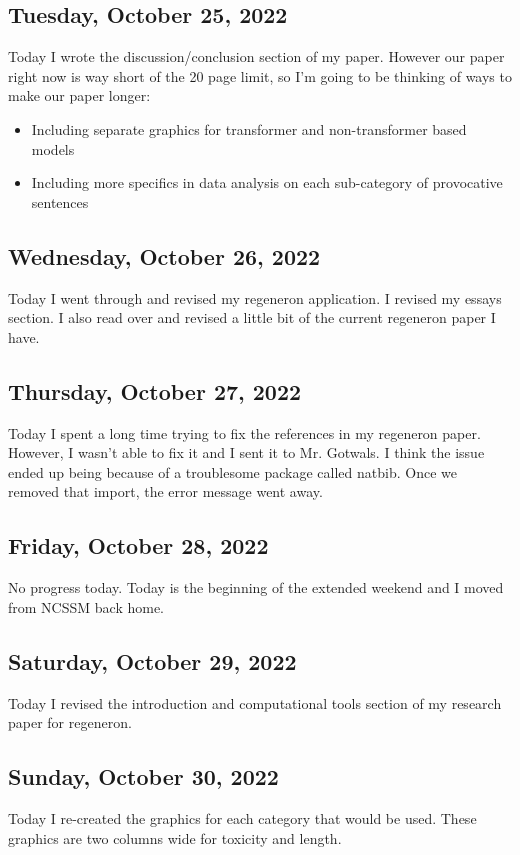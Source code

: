 \documentclass[11pt,letterpaper]{article}
\begin{document}
\subsection{Tuesday, October 25, 2022}
Today I wrote the discussion/conclusion section of my paper. However our paper right now is way short of the 20 page limit, so I'm going to be thinking of ways to make our paper longer:
\begin{itemize}
    \item Including separate graphics for transformer and non-transformer based models
    \item Including more specifics in data analysis on each sub-category of provocative sentences
\end{itemize}


\subsection{Wednesday, October 26, 2022}
Today I went through and revised my regeneron application. I revised my essays section. I also read over and revised a little bit of the current regeneron paper I have.

\subsection{Thursday, October 27, 2022}
Today I spent a long time trying to fix the references in my regeneron paper. However, I wasn't able to fix it and I sent it to Mr. Gotwals. I think the issue ended up being because of a troublesome package called natbib. Once we removed that import, the error message went away.

\subsection{Friday, October 28, 2022}
No progress today. Today is the beginning of the extended weekend and I moved from NCSSM back home.

\subsection{Saturday, October 29, 2022}
Today I revised the introduction and computational tools section of my research paper for regeneron.

\subsection{Sunday, October 30, 2022}
Today I re-created the graphics for each category that would be used. These graphics are two columns wide for toxicity and length. 
\end{document}
